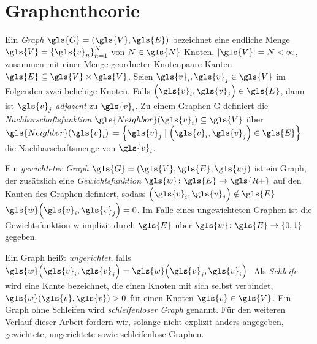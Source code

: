 \section{Graphentheorie}
\label{graphentheorie}

Ein \emph{Graph} $\gls{G} = \left(\gls{V}, \gls{E}\right)$ bezeichnet eine endliche Menge $\gls{V} = {\left\{ \gls{v}_n \right\}}^N_{n=1}$ von $N \in \gls{N}$ Knoten, $\left| \gls{V} \right| = N < \infty$, zusammen mit einer Menge geordneter Knotenpaare \bzw{} Kanten $\gls{E} \subseteq \gls{V} \times \gls{V}$.
Seien $\gls{v}_i, \gls{v}_j \in \gls{V}$ im Folgenden zwei beliebige Knoten.
Falls $\left( \gls{v}_i, \gls{v}_j \right) \in \gls{E}$, dann ist $\gls{v}_j$ \emph{adjazent} zu $\gls{v}_i$.
Zu einem Graphen \gls{G} definiert die \emph{Nachbarschaftsfunktion} $\gls{Neighbor}\left(\gls{v}_i\right) \subseteq \gls{V}$ über $\gls{Neighbor}\left(\gls{v}_i\right) \coloneqq \left\{\gls{v}_j \mid \left(\gls{v}_i, \gls{v}_j\right) \in \gls{E}\right\}$ die Nachbarschaftsmenge von $\gls{v}_i$.

Ein \emph{gewichteter Graph} $\gls{G} = \left(\gls{V}, \gls{E}, \gls{w}\right)$ ist ein Graph, der zusätzlich eine \emph{Gewichtsfunktion} $\gls{w} \colon \gls{E} \to \gls{R+}$ auf den Kanten des Graphen definiert, sodass $\left( \gls{v}_i, \gls{v}_j  \right) \notin \gls{E}$ \gdw{} $\gls{w}\left(\gls{v}_i, \gls{v}_j\right) = 0$.
Im Falle eines ungewichteten Graphen ist die Gewichtsfunktion \gls{w} implizit durch $\gls{E}$ über $\gls{w} \colon \gls{E} \to \left\{ 0, 1 \right\}$ gegeben.

Ein Graph heißt \emph{ungerichtet}, falls $\gls{w}\left(\gls{v}_i, \gls{v}_j\right) = \gls{w}\left(\gls{v}_j, \gls{v}_i\right)$.
Als \emph{Schleife} wird eine Kante bezeichnet, die einen Knoten mit sich selbst verbindet, \dhe{} $\gls{w}\left(\gls{v}, \gls{v}\right) > 0$ für einen Knoten $\gls{v} \in \gls{V}$.
Ein Graph ohne Schleifen wird \emph{schleifenloser Graph} genannt.
Für den weiteren Verlauf dieser Arbeit fordern wir, solange nicht explizit anders angegeben, gewichtete, ungerichtete sowie schleifenlose Graphen.

